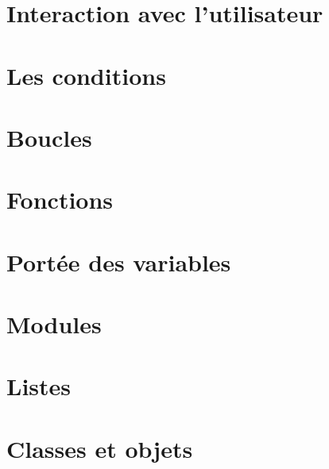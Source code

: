 \documentclass[12pt,a4paper,oneside]{report}
\begin{document}
\section{Interaction avec l'utilisateur}


\section{Les conditions}


\section{Boucles}


\section{Fonctions}


\section{Portée des variables}


\section{Modules}


\section{Listes}




\section{Classes et objets}


\end{document}
